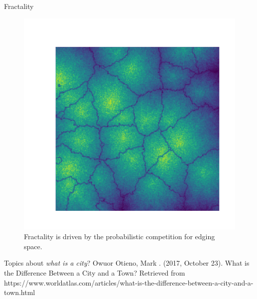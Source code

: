 \documentclass{beamer}
\begin{document}
\begin{frame}{Fractality}
  \begin{figure}
    \includegraphics[width = 0.7\linewidth]{pics/fractal_41_256.pdf}
    \caption{Fractality is driven by the probabilistic competition for edging space.}
  \end{figure}
\end{frame}

\begin{frame}{Topics about \emph{what is a city}?}
  Owuor Otieno, Mark . (2017, October 23). What is the Difference Between a City and a Town? Retrieved from https://www.worldatlas.com/articles/what-is-the-difference-between-a-city-and-a-town.html
\end{frame}
\end{document}
